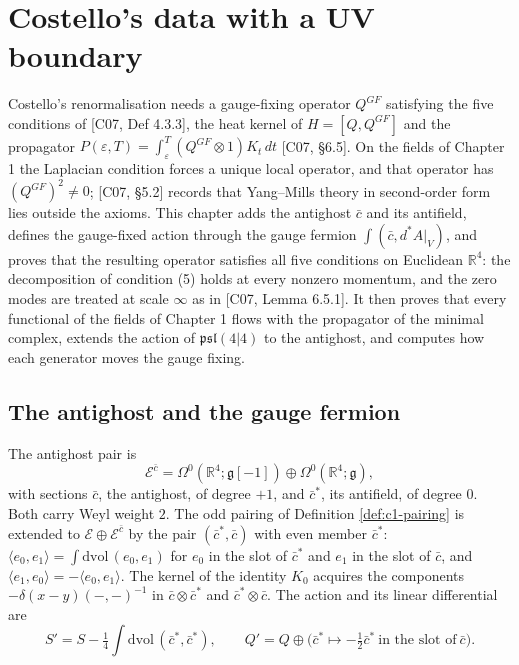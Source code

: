 \chapter{Costello's data with a UV boundary}

Costello's renormalisation needs a gauge-fixing operator $Q^{GF}$ satisfying the five conditions of [C07, Def 4.3.3], the heat kernel of $H=[Q,Q^{GF}]$ and the propagator $P(\varepsilon,T)=\int_\varepsilon^T(Q^{GF}\otimes1)K_t\,dt$ [C07, §6.5]. On the fields of Chapter 1 the Laplacian condition forces a unique local operator, and that operator has $(Q^{GF})^2\neq0$; [C07, §5.2] records that Yang--Mills theory in second-order form lies outside the axioms. This chapter adds the antighost $\bar c$ and its antifield, defines the gauge-fixed action through the gauge fermion $\int(\bar c,d^*A|_V)$, and proves that the resulting operator satisfies all five conditions on Euclidean $\mathbb R^4$: the decomposition of condition (5) holds at every nonzero momentum, and the zero modes are treated at scale $\infty$ as in [C07, Lemma 6.5.1]. It then proves that every functional of the fields of Chapter 1 flows with the propagator of the minimal complex, extends the action of $\mathfrak{psl}(4|4)$ to the antighost, and computes how each generator moves the gauge fixing.

\section{The antighost and the gauge fermion}

\begin{definition}
\label{def:c3-nm}
The antighost pair is
\[
\mathscr E^{\bar c}=\Omega^0(\mathbb R^4;\mathfrak g[-1])\oplus\Omega^0(\mathbb R^4;\mathfrak g),
\]
with sections $\bar c$, the antighost, of degree $+1$, and $\bar c^*$, its antifield, of degree $0$. Both carry Weyl weight $2$. The odd pairing of Definition \ref{def:c1-pairing} is extended to $\mathscr E\oplus\mathscr E^{\bar c}$ by the pair $(\bar c^*,\bar c)$ with even member $\bar c^*$: $\langle e_0,e_1\rangle=\int\mathrm{dvol}\,(e_0,e_1)$ for $e_0$ in the slot of $\bar c^*$ and $e_1$ in the slot of $\bar c$, and $\langle e_1,e_0\rangle=-\langle e_0,e_1\rangle$. The kernel of the identity $K_0$ acquires the components $-\delta(x-y)(-,-)^{-1}$ in $\bar c\otimes\bar c^*$ and $\bar c^*\otimes\bar c$. The action and its linear differential are
\[
S'=S-\tfrac14\int\mathrm{dvol}\,(\bar c^*,\bar c^*),\qquad Q'=Q\oplus\big(\bar c^*\mapsto-\tfrac12\bar c^*\ \text{in the slot of}\ \bar c\big).
\]
\end{definition}


